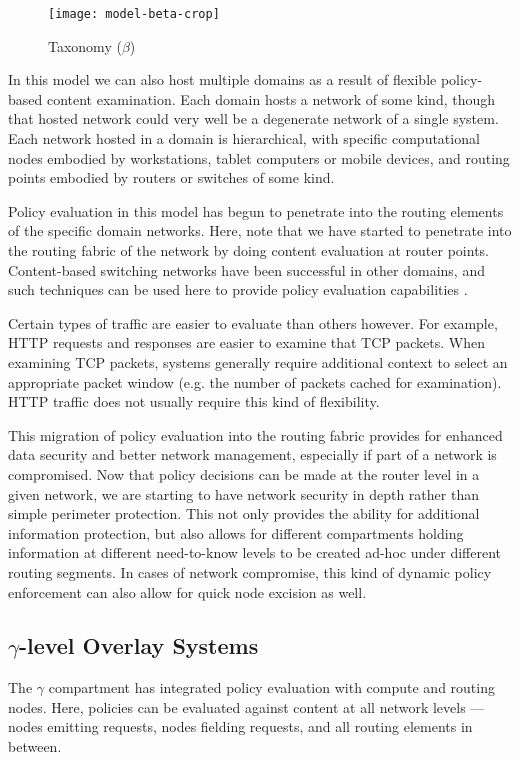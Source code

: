 \begin{figure}[!t]
\centering
\texttt{[image: model-beta-crop]}
\caption{Taxonomy ($\beta$)}
\label{fig:model:taxonomy-beta}
\end{figure}

In this model we can also host multiple domains as a result of flexible policy-based content examination.  Each domain hosts a network of some kind, though that hosted network could very well be a degenerate network of a single system.  Each network hosted in a domain is hierarchical, with specific computational nodes embodied by workstations, tablet computers or mobile devices, and routing points embodied by routers or switches of some kind.

Policy evaluation in this model has begun to penetrate into the routing elements of the specific domain networks.  Here, note that we have started to penetrate into the routing fabric of the network by doing content evaluation at router points.  Content-based switching networks have been successful in other domains, and such techniques can be used here to provide policy evaluation capabilities \cite{proposal:jboss-esb}.  

Certain types of traffic are easier to evaluate than others however.  For example, HTTP requests and responses are easier to examine that TCP packets.  When examining TCP packets, systems generally require additional context to select an appropriate packet window (e.g. the number of packets cached for examination).  HTTP traffic does not usually require this kind of flexibility.

This migration of policy evaluation into the routing fabric provides for enhanced data security and better network management, especially if part of a network is compromised.  Now that policy decisions can be made at the router level in a given network, we are starting to have network security in depth rather than simple perimeter protection.  This not only provides the ability for additional information protection, but also allows for different compartments holding information at different need-to-know levels to be created ad-hoc under different routing segments.  In cases of network compromise, this kind of dynamic policy enforcement can also allow for quick node excision as well.

\subsection{$\gamma$-level Overlay Systems}
The $\gamma$ compartment has integrated policy evaluation with compute and routing nodes.  Here, policies can be evaluated against content at all network levels --- nodes emitting requests, nodes fielding requests, and all routing elements in between.

